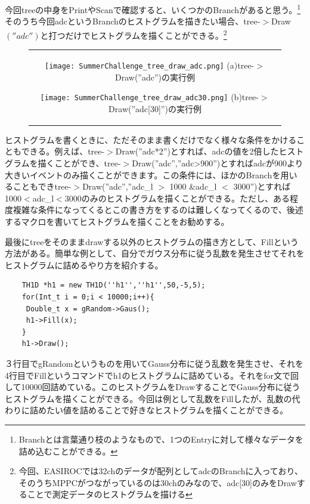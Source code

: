 \documentclass[uplatex,10pt,a4j]{jsarticle}
\begin{document}
今回treeの中身をPrintやScanで確認すると、いくつかのBranchがあると思う。\footnote{Branchとは言葉通り枝のようなもので、1つのEntryに対して様々なデータを詰め込むことができる。}そのうち今回adcというBranchのヒストグラムを描きたい場合、tree-$>$Draw$\left(''adc''\right)$と打つだけでヒストグラムを描くことができる。\footnote{今回、EASIROCでは32chのデータが配列としてadcのBranchに入っており、そのうちMPPCがつながっているのは30chのみなので、adc[30]のみをDrawすることで測定データのヒストグラムを描ける}
\begin{figure}[htbp]
  \begin{center}
    \begin{tabular}{c}

      \begin{minipage}{0.5\hsize}
        \begin{center}
          \texttt{[image: SummerChallenge\_tree\_draw\_adc.png]}
          \hspace{1.6cm} (a)tree-$>$Draw(''adc'')の実行例
        \end{center}
      \end{minipage}

      \begin{minipage}{0.5\hsize}
        \begin{center}
          \texttt{[image: SummerChallenge\_tree\_draw\_adc30.png]}
          \hspace{1.6cm} (b)tree-$>$Draw(''adc[30]'')の実行例
        \end{center}
      \end{minipage}
    \end{tabular}
    \label{fig:tree_draw}
  \end{center}
\end{figure}

ヒストグラムを書くときに、ただそのまま書くだけでなく様々な条件をかけることもできる。例えば、tree-$>$Draw(''adc*2'')とすれば、adcの値を2倍したヒストグラムを描くことができ、tree-$>$Draw(''adc'',''adc>900'')とすればadcが900より大きいイベントのみ描くことができます。この条件には、ほかのBranchを用いることもできtree-$>$Draw(''adc'',''adc\_l $>$ 1000 \&adc\_l $<$ 3000'')とすれば1000$<$adc\_l$<$3000のみのヒストグラムを描くことができる。ただし、ある程度複雑な条件になってくるとこの書き方をするのは難しくなってくるので、後述するマクロを書いてヒストグラムを描くことをお勧めする。

最後にtreeをそのままdrawする以外のヒストグラムの描き方として、Fillという方法がある。簡単な例として、自分でガウス分布に従う乱数を発生させてそれをヒストグラムに詰めるやり方を紹介する。
\begin{lstlisting}
    TH1D *h1 = new TH1D(''h1'',''h1'',50,-5,5);
    for(Int_t i = 0;i < 10000;i++){
     Double_t x = gRandom->Gaus();
     h1->Fill(x);
    }  
    h1->Draw();
 \end{lstlisting}
３行目でgRandomというものを用いてGauss分布に従う乱数を発生させ、それを4行目でFillというコマンドでh1のヒストグラムに詰めている。それをfor文で回して10000回詰めている。このヒストグラムをDrawすることでGauss分布に従うヒストグラムを描くことができる。今回は例として乱数をFillしたが、乱数の代わりに詰めたい値を詰めることで好きなヒストグラムを描くことができる。
\end{document}
